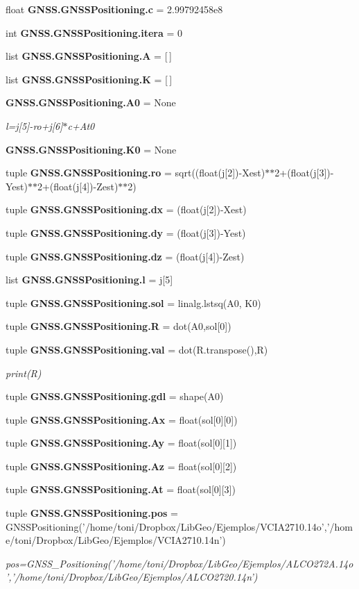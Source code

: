 \begin{DoxyCompactItemize}
float {\bf G\-N\-S\-S.\-G\-N\-S\-S\-Positioning.\-c} = 2.\-99792458e8
\item 
int {\bf G\-N\-S\-S.\-G\-N\-S\-S\-Positioning.\-itera} = 0
\item 
list {\bf G\-N\-S\-S.\-G\-N\-S\-S\-Positioning.\-A} = [$\,$]
\item 
list {\bf G\-N\-S\-S.\-G\-N\-S\-S\-Positioning.\-K} = [$\,$]
\item 
{\bf G\-N\-S\-S.\-G\-N\-S\-S\-Positioning.\-A0} = None
\begin{DoxyCompactList}\small\item\em l=j[5]-\/ro+j[6]$\ast$c+\-At0 \end{DoxyCompactList}\item 
{\bf G\-N\-S\-S.\-G\-N\-S\-S\-Positioning.\-K0} = None
\item 
tuple {\bf G\-N\-S\-S.\-G\-N\-S\-S\-Positioning.\-ro} = sqrt((float(j[2])-\/Xest)$\ast$$\ast$2+(float(j[3])-\/Yest)$\ast$$\ast$2+(float(j[4])-\/Zest)$\ast$$\ast$2)
\item 
tuple {\bf G\-N\-S\-S.\-G\-N\-S\-S\-Positioning.\-dx} = (float(j[2])-\/Xest)
\item 
tuple {\bf G\-N\-S\-S.\-G\-N\-S\-S\-Positioning.\-dy} = (float(j[3])-\/Yest)
\item 
tuple {\bf G\-N\-S\-S.\-G\-N\-S\-S\-Positioning.\-dz} = (float(j[4])-\/Zest)
\item 
list {\bf G\-N\-S\-S.\-G\-N\-S\-S\-Positioning.\-l} = j[5]
\item 
tuple {\bf G\-N\-S\-S.\-G\-N\-S\-S\-Positioning.\-sol} = linalg.\-lstsq(A0, K0)
\item 
tuple {\bf G\-N\-S\-S.\-G\-N\-S\-S\-Positioning.\-R} = dot(A0,sol[0])
\item 
tuple {\bf G\-N\-S\-S.\-G\-N\-S\-S\-Positioning.\-val} = dot(R.\-transpose(),R)
\begin{DoxyCompactList}\small\item\em print(\-R) \end{DoxyCompactList}\item 
tuple {\bf G\-N\-S\-S.\-G\-N\-S\-S\-Positioning.\-gdl} = shape(A0)
\item 
tuple {\bf G\-N\-S\-S.\-G\-N\-S\-S\-Positioning.\-Ax} = float(sol[0][0])
\item 
tuple {\bf G\-N\-S\-S.\-G\-N\-S\-S\-Positioning.\-Ay} = float(sol[0][1])
\item 
tuple {\bf G\-N\-S\-S.\-G\-N\-S\-S\-Positioning.\-Az} = float(sol[0][2])
\item 
tuple {\bf G\-N\-S\-S.\-G\-N\-S\-S\-Positioning.\-At} = float(sol[0][3])
\item 
tuple {\bf G\-N\-S\-S.\-G\-N\-S\-S\-Positioning.\-pos} = G\-N\-S\-S\-Positioning('/home/toni/Dropbox/Lib\-Geo/Ejemplos/V\-C\-I\-A2710.\-14o','/home/toni/Dropbox/Lib\-Geo/Ejemplos/V\-C\-I\-A2710.\-14n')
\begin{DoxyCompactList}\small\item\em pos=G\-N\-S\-S\-\_\-\-Positioning('/home/toni/\-Dropbox/\-Lib\-Geo/\-Ejemplos/\-A\-L\-C\-O272\-A.14o','/home/toni/\-Dropbox/\-Lib\-Geo/\-Ejemplos/\-A\-L\-C\-O2720.14n') \end{DoxyCompactList}\end{DoxyCompactItemize}

